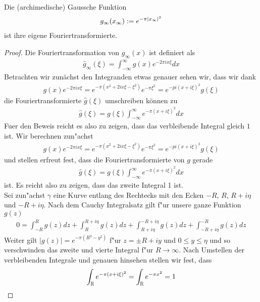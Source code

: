 	\begin{satz}
		Die (archimedische) Gaussche Funktion
		\begin{align}
			g_\infty(x_\infty) := e^{-\pi |x_\infty|^2}
		\end{align}
		ist ihre eigene Fouriertransformierte.
	\end{satz}

	\begin{proof}
		Die Fouriertransformation von $g_\infty(x)$ ist definiert als
		\begin{align*}
			\hat{g}_\infty (\xi) = \int_{-\infty}^{\infty}{g(x)e^{-2\pi i x \xi}dx}
		\end{align*}
		Betrachten wir zunächst den Integranden etwas genauer sehen wir, dass wir dank
		\begin{align*}
			g(x)e^{-2\pi i x \xi} = e^{-\pi(x^2 +2 i x \xi - \xi ^2)}e^{-\pi \xi^2} = e^{-pi (x + i \xi)^2} g(\xi)
		\end{align*}
		die Fouriertransformierte $\hat{g} (\xi)$ umschreiben können zu
		\begin{align*}
			\hat{g}(\xi) = g(\xi) \int_{-\infty}^{\infty} {e^{-\pi(x+i\xi)^2}dx}
		\end{align*}
		Fuer den Beweis reicht es also zu zeigen, dass das verbleibende Integral gleich $1$ ist.
		Wir berechnen zun"achst
		\begin{align*}
			g(x)e^{-2\pi i x \xi} = e^{-\pi(x^2 +2 i x \xi - \xi ^2)}e^{-\pi \xi^2} = e^{-pi (x + i \xi)^2} g(\xi)
		\end{align*}
		und stellen erfreut fest, dass die Fouriertransformierte von $g$ gerade
		\begin{align*}
			\hat{g}(\xi) = g(\xi) \int_{-\infty}^{\infty} e^{-\pi(x+i\xi)^2}dx
		\end{align*}
		ist. Es reicht also zu zeigen, dass das zweite Integral 1 ist.\\
		Sei zun"achst $\gamma$ eine Kurve entlang des Rechtecks mit den Ecken $-R$, $R$, $R+i\eta$ und $-R+i\eta$. 
		Nach dem Cauchy Integralsatz gilt f"ur unsere ganze Funktion $g(z)$
		\begin{align*}
			0 = \int_{-R}^{R} {g(z)dz} + \int_{R}^{R+i\eta} {g(z)dz}  + \int_{R+i\eta}^{-R+i\eta} {g(z)dz}  + \int_{-R+i\eta}^{-R} {g(z)dz} 
		\end{align*}
		Weiter gilt $|g(z)|=e^{-\pi (R^2 - y^2)}$ f"ur $z=\pm R + i y$ und $0\leq y \leq \eta$ und so verschwinden das zweite und vierte Integral f"ur $R\rightarrow \infty$. 
		Nach Umstellen der verbleibenden Integrale und genauen hinsehen stellen wir fest, dass
		\begin{align*}
			\int_{\mathbb{R}}{e^{-\pi (x + i\xi)^2}} = \int_{\mathbb{R}} {e^{-\pi x^2} = 1}
		\end{align*}
	\end{proof}

